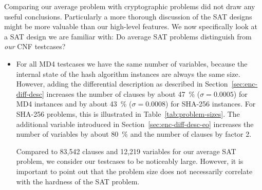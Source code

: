 Comparing our average problem with cryptographic problems did
not draw any useful conclusions. Particularly a more thorough discussion
of the SAT designs might be more valuable than our high-level features.
We now specifically look at a SAT design we are familiar with:
Do average SAT problems distinguish from \emph{our} CNF testcases?

\begin{itemize}
  \item For all MD4 testcases we have the same number of variables,
    because the internal state of the hash algorithm instances are
    always the same size.
    However, adding the differential description as described in
    Section~\ref{sec:enc-diff-desc} increases the number of clauses
    by about 47~\% ($\sigma = 0.0005$) for MD4 instances and
    by about 43~\% ($\sigma = 0.0008$) for SHA-256 instances.
    For SHA-256 problems, this is illustrated in Table~\ref{tab:problem-sizes}.
    The additional variable introduced in Section~\ref{sec:enc-diff-desc-eo}
    increases the number of variables by about 80~\%
    and the number of clauses by factor 2.


    Compared to 83,542 clauses and 12,219 variables for our average SAT problem,
    we consider our testcases to be noticeably large. However, it is important to
    point out that the problem size does not necessarily correlate with
    the hardness of the SAT problem.


\end{itemize}
